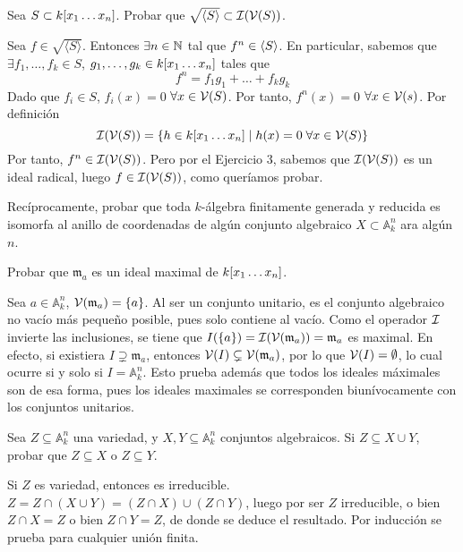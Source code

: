 \documentclass[twoside]{article}
\begin{document}
\newpage 
\begin{ejercicio}{4}
Sea $S\subset k[x_1\dotsc x_{n}]$. Probar que $\sqrt{\langle{S}\rangle}\subset \mathcal{I}(\mathcal{V}(S))$.
\begin{solucion}
Sea $f\in \sqrt{\langle{S}\rangle}$. Entonces $\exists n \in \mathbb{N}$ tal que $f^n \in \langle{S}\rangle$. En particular, sabemos que $\exists f_1,\dotsc,f_k\in S$, $g_1,\dotsc,g_k \in k[x_1\dotsc x_{n}]$ tales que
$$
f^n = f_1 g_1 + \dotsc + f_k g_k 
$$
Dado que $f_i\in S$, $f_i(x)=0$ $\forall x \in \mathcal{V}(S)$. Por tanto, $f^n(x) = 0$ $\forall x \in \mathcal{V}(s)$. Por definición
$$
\mathcal{I}(\mathcal{V}(S)) =  \{ h \in k[x_1\dotsc x_{n}] \mid h(x)=0 \; \forall x\in \mathcal{V}(S)\}
$$
Por tanto, $f^n \in \mathcal{I}(\mathcal{V}(S))$. Pero por el Ejercicio 3, sabemos que $\mathcal{I}(\mathcal{V}(S))$ es un ideal radical, luego $f\in \mathcal{I}(\mathcal{V}(S))$, como queríamos probar.
\end{solucion}
\end{ejercicio}

\newpage 
\begin{ejercicio}{5}
Recíprocamente, probar que toda $k$-álgebra finitamente generada
y reducida es isomorfa al anillo de coordenadas de algún conjunto algebraico $X \subset \mathbb{A}^n_k$ ara algún $n$.\begin{solucion}
\end{solucion}
\end{ejercicio}

\newpage 
\begin{ejercicio}{6}
Probar que $\mathfrak{m}_a$ es un ideal maximal de $k[x_1\dotsc x_{n}]$.
\end{ejercicio}
\begin{solucion}
Sea $a\in \mathbb{A}^n_k$, $\mathcal{V}(\mathfrak{m}_a)=\{a\}$. Al ser un conjunto unitario, es el conjunto algebraico no vacío más pequeño posible, pues solo contiene al vacío. Como el operador $\mathcal{I}$ invierte las inclusiones, se tiene que $I(\{a\})=\mathcal{I}(\mathcal{V}(\mathfrak{m}_a))=\mathfrak{m}_a$ es maximal. En efecto, si existiera $I\supsetneq\mathfrak{m}_a$, entonces $\mathcal{V}(I)\subsetneq \mathcal{V}(\mathfrak{m}_a)$, por lo que $\mathcal{V}(I)=\emptyset$, lo cual ocurre si y solo si $I=\mathbb{A}^n_k$. Esto prueba además que todos los ideales máximales son de esa forma, pues los ideales maximales se corresponden biunívocamente con los conjuntos unitarios.
\end{solucion}

\newpage 
\begin{ejercicio}{7}
Sea $Z ⊆ \mathbb{A}^n_k$ una variedad, y $X, Y ⊆ \mathbb{A}^n_k$ conjuntos algebraicos.
Si $Z ⊆ X ∪ Y$, probar que $Z ⊆ X$ o $Z ⊆ Y$.
\end{ejercicio}
\begin{solucion}
Si $Z$ es variedad, entonces es irreducible. $Z=Z\cap( X\cup Y)=(Z\cap X)\cup(Z\cap Y)$, luego por ser $Z$ irreducible, o bien $Z\cap X=Z$ o bien $Z\cap Y=Z$, de donde se deduce el resultado. Por inducción se prueba para cualquier unión finita.
\end{solucion}
\end{document}

